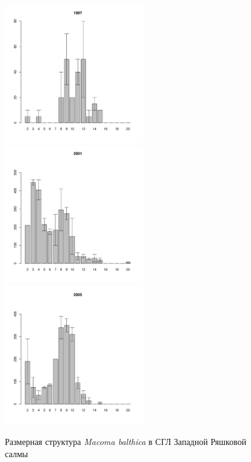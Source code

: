 \documentclass[12pt, a4paper]{article}
\begin{document}
\begin{figure}[h]
\begin{multicols}{3}
\hfill
\includegraphics[width=60mm]{../White_Sea/Ryashkov_ZRS/zrs2_1997_.pdf}
\hfill
\includegraphics[width=60mm]{../White_Sea/Ryashkov_ZRS/zrs2_2001_.pdf}
\hfill
\includegraphics[width=60mm]{../White_Sea/Ryashkov_ZRS/zrs2_2005_.pdf}
\end{multicols}


\caption{Размерная структура {\it Macoma balthica} в СГЛ Западной Ряшковой салмы}
\label{ris:size_str_ZRS}
\end{figure}
\end{document}
